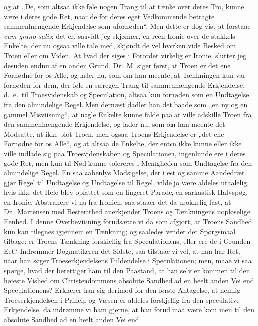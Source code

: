 og at „De, som altsaa ikke føle nogen Trang til at tænke over
deres Tro, kunne være i deres gode Ret, naar de for deres eget
Vedkommende betragte sammenhængende Erkjendelse som ufornøden“.
Men dette er dog vist at forstaae \textit{cum grano salis}; det
er, saavidt jeg skjønner, en reen Ironie over de stakkels Enkelte,
der nu ogsaa ville tale med, skjøndt de vel hverken vide Besked om
Troen eller om Viden. At hvad der siges i Forordet virkelig er
Ironie, slutter jeg desuden endnu af en anden Grund. Dr.\ M. siger
først, at Troen er det ene Fornødne for os Alle, og lader nu, som
om han meente, at Tænkningen kun var fornøden for dem, der føle en
særegen Trang til sammenhængende Erkjendelse, d.\ e.\ til
Troesvidenskab og Speculation, altsaa kun fornøden som en
Undtagelse fra den almindelige Regel. Men dernæst dadler han det
baade som „en ny og en gammel Misviisning“, at nogle Enkelte kunne
falde paa at ville adskille Troen fra den sammenhængende
Erkjendelse, og lader nu,
 som om han meente det Modsatte, at ikke blot Troen, men ogsaa
Troens Erkjendelse er „det ene Fornødne for os Alle“, og at altsaa
de Enkelte, der enten ikke kunne eller ikke ville indlade sig paa
Troesvidenskaben og Speculationen, ingenlunde ere i deres gode
Ret, men kun til Nød kunne tolereres i Menigheden som Undtagelse
fra den almindelige Regel. En saa aabenlys Modsigelse, der i eet
og samme Aandedræt gjør Regel til Undtagelse og Undtagelse til
Regel, vilde jo være aldeles utaalelig, hvis ikke det Hele blev
opfattet som en fingeret Parade, en sarkastisk Halvspøg, en
Ironie. Abstrahere vi nu fra Ironien, saa staaer det da urokkelig
fast, at Dr.\ Martensen med Bestemthed anerkjender Troens og
Tænkningens uopløselige Eenhed. I denne Overbeviisning forudsætte
vi da som afgjort, at Troens Sandhed kun kan tilegnes igjennem en
Tænkning; og saaledes vender det Spørgsmaal tilbage: er Troens
Tænkning forskiellig fra Speculationens, eller ere de i Grunden
Eet? Indrømmer Dogmatikeren det Sidste, saa tilstaae vi vel, at
han har Ret, naar han søger Troeserkjendelsens Fuldendelse i
Speculationen; men, maae vi saa spørge, hvad der berettiger ham
til den Paastand, at han selv er kommen til den høieste Vished om
Christendommens absolute Sandhed ad en heelt anden Vei end
Speculationens? Erklærer han sig derimod for den første
Antagelse, at nemlig Troeserkjendelsen i Princip og Væsen er
aldeles forskjellig fra den speculative Erkjendelse, da indrømme
vi ham gjerne, at han forud maa være kom%
men til den absolute Sandhed ad en heelt anden Vei end
